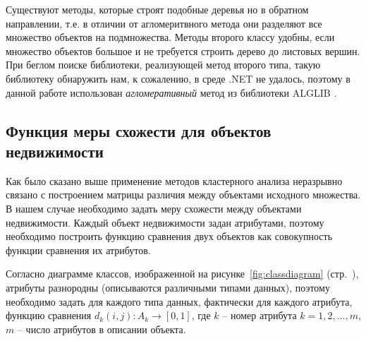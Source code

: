 \documentclass[a4paper,14pt,openany,final]{extreport} %
\begin{document}
{Существуют методы, которые строят подобные деревья но в обратном направлении, т.е. в отличии от агломеритвного метода они разделяют все множество объектов на подмножества.  Методы второго классу удобны, если множество объектов большое и не требуется строить дерево до листовых вершин. При беглом поиске библиотеки, реализующей метод второго типа, такую библиотеку обнаружить нам, к сожалению, в среде .NET не удалось, поэтому в данной работе использован \emph{агломеративный} метод из библиотеки \textsc{ALGLIB} \cite{alglib}. %

\subsection{Функция меры схожести для объектов недвижимости}

Как было сказано выше применение методов кластерного анализа неразрывно связано с построением матрицы различия между объектами исходного множества. В нашем случае необходимо задать меру схожести между объектами недвижимости. Каждый объект недвижимости задан атрибутами, поэтому необходимо построить функцию сравнения двух объектов как совокупность функции сравнения их атрибутов.

Согласно диаграмме классов, изображенной на рисунке~\ref{fig:classdiagram} (стр.~\pageref{fig:classdiagram}), атрибуты разнородны (описываются различными типами данных), поэтому необходимо задать для каждого типа данных, фактически для каждого атрибута, функцию сравнения $d_k(i,j):A_k\to [0,1]$, где $k$ -- номер атрибута $k=1,2,\ldots,m$, $m$ -- число атрибутов в описании объекта.

}
\end{document}
